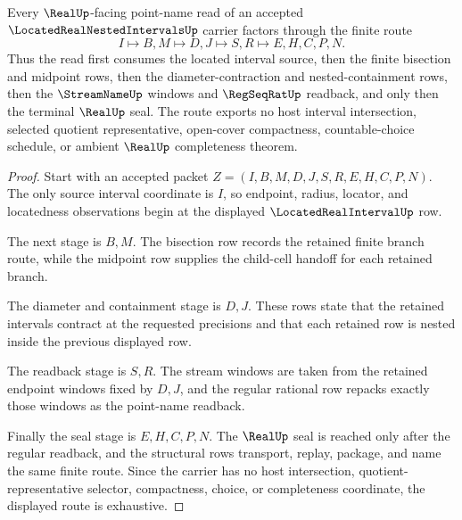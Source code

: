 \begin{theorem}
\label{thm:located-real-nested-intervals-point-name}
Every $\RealUp$-facing point-name read of an accepted $\LocatedRealNestedIntervalsUp$ carrier factors through the finite route
$$
I \longmapsto B,M \longmapsto D,J \longmapsto S,R \longmapsto E,H,C,P,N .
$$
Thus the read first consumes the located interval source, then the finite bisection and midpoint rows, then the diameter-contraction and nested-containment rows, then the $\StreamNameUp$ windows and $\RegSeqRatUp$ readback, and only then the terminal $\RealUp$ seal. The route exports no host interval intersection, selected quotient representative, open-cover compactness, countable-choice schedule, or ambient $\RealUp$ completeness theorem.
\end{theorem}
\begin{proof}
Start with an accepted packet $Z=(I,B,M,D,J,S,R,E,H,C,P,N)$. The only source interval coordinate is $I$, so endpoint, radius, locator, and locatedness observations begin at the displayed $\LocatedRealIntervalUp$ row.

The next stage is $B,M$. The bisection row records the retained finite branch route, while the midpoint row supplies the child-cell handoff for each retained branch.

The diameter and containment stage is $D,J$. These rows state that the retained intervals contract at the requested precisions and that each retained row is nested inside the previous displayed row.

The readback stage is $S,R$. The stream windows are taken from the retained endpoint windows fixed by $D,J$, and the regular rational row repacks exactly those windows as the point-name readback.

Finally the seal stage is $E,H,C,P,N$. The $\RealUp$ seal is reached only after the regular readback, and the structural rows transport, replay, package, and name the same finite route. Since the carrier has no host intersection, quotient-representative selector, compactness, choice, or completeness coordinate, the displayed route is exhaustive.
\end{proof}


